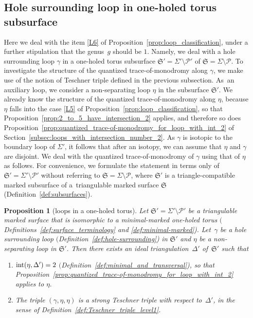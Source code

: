 \documentclass[pdftex]{sigma}
\numberwithin{equation}{section}
\newtheorem{Proposition}[Theorem]{Proposition}
\theoremstyle{definition}
\begin{document}
\subsection{Hole surrounding loop in one-holed torus subsurface}
\label{subsec:loops_in_one-holed_torus}
Here we deal with the item \ref{L6} of Proposition~\ref{prop:loop_classification}, under a further stipulation that the genus~$g$ should be $1$. Namely, we deal with a hole surrounding loop $\gamma$ in a one-holed torus subsurface $\mathfrak{S}' = \Sigma' \setminus \mathcal{P}'$ of $\mathfrak{S} = \Sigma\setminus\mathcal{P}$. To investigate the structure of the quantized trace-of-monodromy along $\gamma$, we make use of the notion of Teschner triple defined in the previous subsection. As~an auxiliary loop, we consider a non-separating loop $\eta$ in the subsurface $\mathfrak{S}'$. We already know the structure of the quantized trace-of-monodromy along $\eta$, because $\eta$ falls into the case \ref{L5} of Proposition~\ref{prop:loop_classification}, so that Proposition~\ref{prop:2_to_5_have_intersection_2} applies, and therefore so does Proposition~\ref{prop:quantized_trace-of-monodromy_for_loop_with_int_2} of Section~\ref{subsec:loops_with_intersection_number_2}. As $\gamma$ is isotopic to the boundary loop of $\Sigma'$, it follows that after an isotopy, we can assume that $\eta$ and $\gamma$ are disjoint. We deal with the quantized trace-of-monodromy of $\gamma$ using that of $\eta$ as follows. For convenience, we formulate the statement in terms only of $\mathfrak{S}' = \Sigma' \setminus \mathcal{P}'$ without referring to $\mathfrak{S} = \Sigma \setminus \mathcal{P}$, where $\mathfrak{S}'$ is a triangle-compatible marked subsurface of a~triangulable marked surface $\mathfrak{S}$ (Definition~\ref{def:subsurfaces}).
\begin{Proposition}[loops in a one-holed torus]
\label{prop:loops_in_a_one-holed_torus}
Let $\mathfrak{S}' = \Sigma'\setminus\mathcal{P}'$ be a triangulable marked surface that is isomorphic to a minimal-marked one-holed torus $($Definitions~{\rm \ref{def:surface_terminology}} and {\rm \ref{def:minimal-marked})}. Let~$\gamma$ be a hole surrounding loop $($Definition~{\rm \ref{def:hole-surrounding})} in $\mathfrak{S}'$ and $\eta$ be a non-separating loop in $\mathfrak{S}'$. Then there exists an ideal triangulation~$\Delta'$ of~$\mathfrak{S}'$ such that
\begin{enumerate}\itemsep=0pt
\item[\rm (1)] ${\rm int}(\eta,\Delta')=2$ $($Definition~{\rm \ref{def:minimal_and_transversal})}, so that Proposition~{\rm \ref{prop:quantized_trace-of-monodromy_for_loop_with_int_2}} applies to $\eta$.
\item[\rm (2)] The triple $(\gamma,\eta,\eta)$ is a strong Teschner triple with respect to~$\Delta'$, in the sense of Definition~{\rm \ref{def:Teschner_triple_level1}}.
\end{enumerate}
\end{Proposition}
\end{document}
